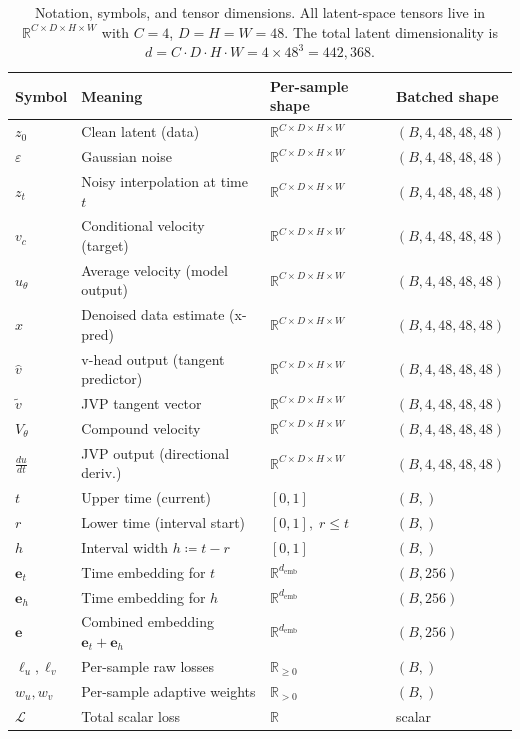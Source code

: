 \documentclass[11pt,a4paper]{article}
\begin{document}
\begin{table}[ht]
\centering
\caption{Notation, symbols, and tensor dimensions.  All latent-space tensors
live in $\mathbb{R}^{C \times D \times H \times W}$ with $C{=}4$,
$D{=}H{=}W{=}48$.  The total latent dimensionality is
$d = C \cdot D \cdot H \cdot W = 4 \times 48^3 = 442{,}368$.}
\label{tab:notation}
\small
\begin{tabular}{llll}
\toprule
\textbf{Symbol} & \textbf{Meaning} & \textbf{Per-sample shape} & \textbf{Batched shape} \\
\midrule
$z_0$ & Clean latent (data) & $\mathbb{R}^{C \times D \times H \times W}$ & $(B, 4, 48, 48, 48)$ \\
$\varepsilon$ & Gaussian noise & $\mathbb{R}^{C \times D \times H \times W}$ & $(B, 4, 48, 48, 48)$ \\
$z_t$ & Noisy interpolation at time $t$ & $\mathbb{R}^{C \times D \times H \times W}$ & $(B, 4, 48, 48, 48)$ \\
$v_c$ & Conditional velocity (target) & $\mathbb{R}^{C \times D \times H \times W}$ & $(B, 4, 48, 48, 48)$ \\
$u_\theta$ & Average velocity (model output) & $\mathbb{R}^{C \times D \times H \times W}$ & $(B, 4, 48, 48, 48)$ \\
$\hat{x}$ & Denoised data estimate (x-pred) & $\mathbb{R}^{C \times D \times H \times W}$ & $(B, 4, 48, 48, 48)$ \\
$\hat{v}$ & v-head output (tangent predictor) & $\mathbb{R}^{C \times D \times H \times W}$ & $(B, 4, 48, 48, 48)$ \\
$\tilde{v}$ & JVP tangent vector & $\mathbb{R}^{C \times D \times H \times W}$ & $(B, 4, 48, 48, 48)$ \\
$V_\theta$ & Compound velocity & $\mathbb{R}^{C \times D \times H \times W}$ & $(B, 4, 48, 48, 48)$ \\
$\frac{du}{dt}$ & JVP output (directional deriv.) & $\mathbb{R}^{C \times D \times H \times W}$ & $(B, 4, 48, 48, 48)$ \\
\midrule
$t$ & Upper time (current) & $[0,1]$ & $(B,)$ \\
$r$ & Lower time (interval start) & $[0,1],\; r \le t$ & $(B,)$ \\
$h$ & Interval width $h \coloneqq t - r$ & $[0,1]$ & $(B,)$ \\
\midrule
$\mathbf{e}_t$ & Time embedding for $t$ & $\mathbb{R}^{d_\mathrm{emb}}$ & $(B, 256)$ \\
$\mathbf{e}_h$ & Time embedding for $h$ & $\mathbb{R}^{d_\mathrm{emb}}$ & $(B, 256)$ \\
$\mathbf{e}$ & Combined embedding $\mathbf{e}_t + \mathbf{e}_h$ & $\mathbb{R}^{d_\mathrm{emb}}$ & $(B, 256)$ \\
\midrule
$\ell_u, \ell_v$ & Per-sample raw losses & $\mathbb{R}_{\ge 0}$ & $(B,)$ \\
$w_u, w_v$ & Per-sample adaptive weights & $\mathbb{R}_{> 0}$ & $(B,)$ \\
$\mathcal{L}$ & Total scalar loss & $\mathbb{R}$ & scalar \\
\bottomrule
\end{tabular}
\end{table}
\end{document}
